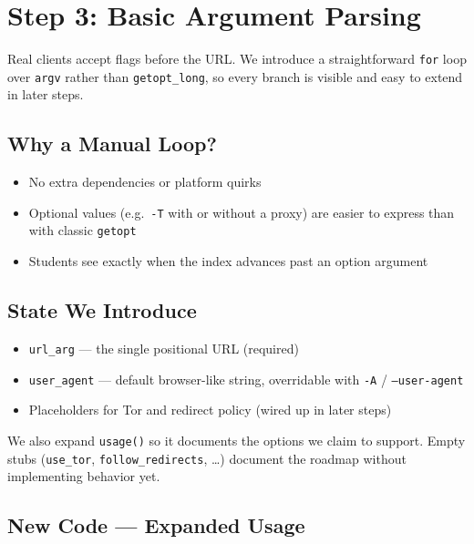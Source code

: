 \section{Step 3: Basic Argument Parsing}

Real clients accept flags before the URL. We introduce a straightforward
\texttt{for} loop over \texttt{argv} rather than \texttt{getopt\_long}, so
every branch is visible and easy to extend in later steps.

\subsection{Why a Manual Loop?}

\begin{itemize}[leftmargin=1.4em]
    \item No extra dependencies or platform quirks
    \item Optional values (e.g.\ \texttt{-T} with or without a proxy) are
          easier to express than with classic \texttt{getopt}
    \item Students see exactly when the index advances past an option argument
\end{itemize}

\subsection{State We Introduce}

\begin{itemize}[leftmargin=1.4em]
    \item \texttt{url\_arg} --- the single positional URL (required)
    \item \texttt{user\_agent} --- default browser-like string, overridable
          with \texttt{-A} / \texttt{--user-agent}
    \item Placeholders for Tor and redirect policy (wired up in later steps)
\end{itemize}

We also expand \texttt{usage()} so it documents the options we claim to
support. Empty stubs (\texttt{use\_tor}, \texttt{follow\_redirects}, \ldots)
document the roadmap without implementing behavior yet.

\subsection{New Code --- Expanded Usage}

